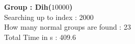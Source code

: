 \textbf{Group : Dih($10000$)}\\
Searching up to index : 2000\\
How many normal groups are found : 23\\
Total Time in s : 409.6\\
